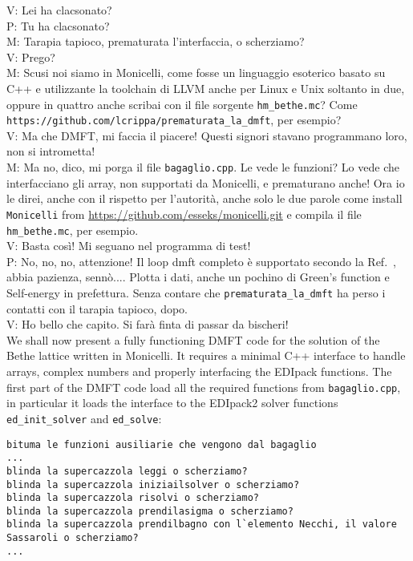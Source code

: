 \documentclass[preprint,3p,10pt]{elsarticle}
\def\NAME{{\rm EDIpack2}\xspace}
\begin{document}
\noindent
V: Lei ha clacsonato?\\
P: Tu ha clacsonato?\\
M: Tarapia tapioco, prematurata l'interfaccia, o scherziamo?\\
V: Prego?\\
M: Scusi noi siamo in Monicelli, come fosse un linguaggio esoterico
basato su C++ e utilizzante la toolchain di LLVM anche per Linux e
Unix soltanto in due, oppure in quattro anche scribai con il file
sorgente {\tt hm\_bethe.mc}?  Come {\tt
  https://github.com/lcrippa/prematurata\_la\_dmft}, per esempio?\\
V: Ma che DMFT, mi faccia il piacere! Questi signori stavano
programmano loro, non si intrometta!\\
M: Ma no, dico, mi porga il file {\tt bagaglio.cpp}. Le vede le
funzioni? Lo vede che interfacciano gli array, non supportati da
Monicelli, e prematurano anche! 
Ora io le direi, anche con il rispetto per l'autorità, anche solo le
due parole come install {\tt Monicelli} from
\href{github.com/esseks/monicelli.git}{https://github.com/esseks/monicelli.git}
e compila il file {\tt hm\_bethe.mc}, per esempio.\\
V: Basta così! Mi seguano nel programma di test!\\
P: No, no, no, attenzione! Il loop dmft completo \`e supportato
secondo la Ref.~\cite{Georges1996RMP}, abbia pazienza,
senn\`o.... Plotta i dati, anche un pochino di Green's function e
Self-energy in prefettura.
Senza contare che {\tt prematurata\_la\_dmft} ha perso i contatti con il tarapia tapioco, dopo.\\
V: Ho bello che capito. Si farà finta di passar da bischeri!\\

We shall now present a fully functioning DMFT code for
the solution of the Bethe lattice written in Monicelli. It requires a minimal C++
interface to handle arrays, complex numbers and properly interfacing
the EDIpack functions.
The first part of the DMFT code load all the required functions from
{\tt bagaglio.cpp}, in particular it loads the interface to the \NAME
solver functions {\tt ed\_init\_solver} and {\tt ed\_solve}:

\begin{lstlisting}[style=cstyle]
bituma le funzioni ausiliarie che vengono dal bagaglio
...
blinda la supercazzola leggi o scherziamo?
blinda la supercazzola iniziailsolver o scherziamo?
blinda la supercazzola risolvi o scherziamo?
blinda la supercazzola prendilasigma o scherziamo?
blinda la supercazzola prendilbagno con l`elemento Necchi, il valore Sassaroli o scherziamo?
...
\end{lstlisting}
\end{document}
